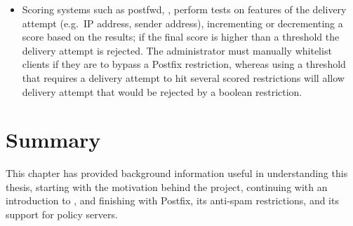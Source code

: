 \begin{itemize}
    \item Scoring systems such as postfwd,
        , perform tests on
        features of the delivery attempt (e.g.\ IP address, sender
        address), incrementing or decrementing a score based on the
        results; if the final score is higher than a threshold the delivery
        attempt is rejected.  The administrator must manually whitelist
        clients if they are to bypass a Postfix restriction, whereas using
        a threshold that requires a delivery attempt to hit several scored
        restrictions will allow delivery attempt that would be rejected by
        a boolean restriction.

\end{itemize}

\section{Summary}

This chapter has provided background information useful in understanding
this thesis, starting with the motivation behind the project, continuing
with an introduction to , and finishing with Postfix, its
anti-spam restrictions, and its support for policy servers.
